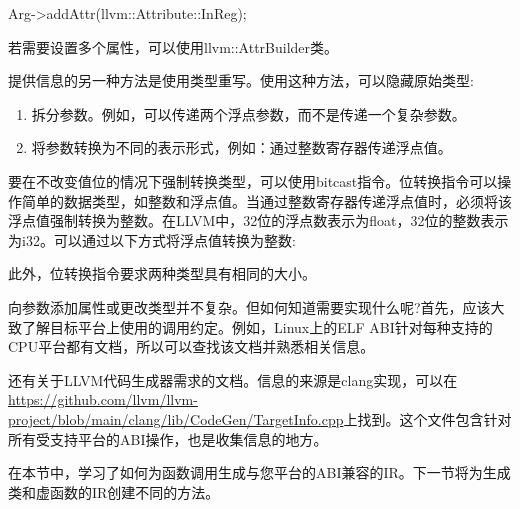 \begin{cpp}
Arg->addAttr(llvm::Attribute::InReg);
\end{cpp}

若需要设置多个属性，可以使用llvm::AttrBuilder类。

提供信息的另一种方法是使用类型重写。使用这种方法，可以隐藏原始类型:

\begin{enumerate}
\item
拆分参数。例如，可以传递两个浮点参数，而不是传递一个复杂参数。

\item
将参数转换为不同的表示形式，例如：通过整数寄存器传递浮点值。
\end{enumerate}

要在不改变值位的情况下强制转换类型，可以使用bitcast指令。位转换指令可以操作简单的数据类型，如整数和浮点值。当通过整数寄存器传递浮点值时，必须将该浮点值强制转换为整数。在LLVM中，32位的浮点数表示为float，32位的整数表示为i32。可以通过以下方式将浮点值转换为整数:

\begin{shell}
\end{shell}

此外，位转换指令要求两种类型具有相同的大小。

向参数添加属性或更改类型并不复杂。但如何知道需要实现什么呢?首先，应该大致了解目标平台上使用的调用约定。例如，Linux上的ELF ABI针对每种支持的CPU平台都有文档，所以可以查找该文档并熟悉相关信息。

还有关于LLVM代码生成器需求的文档。信息的来源是clang实现，可以在\url{https://github.com/llvm/llvm-project/blob/main/clang/lib/CodeGen/TargetInfo.cpp}上找到。这个文件包含针对所有受支持平台的ABI操作，也是收集信息的地方。

在本节中，学习了如何为函数调用生成与您平台的ABI兼容的IR。下一节将为生成类和虚函数的IR创建不同的方法。




















































